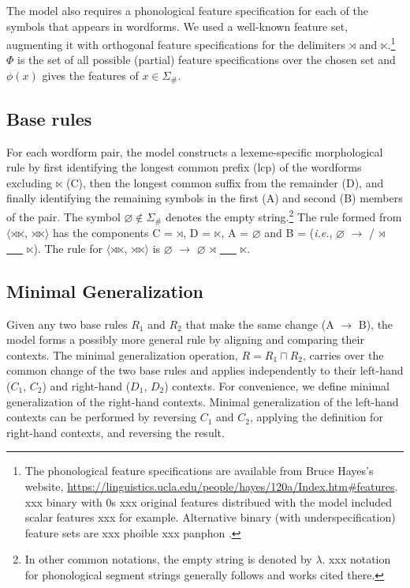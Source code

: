 \documentclass[11pt]{article}
\begin{document}
The model also requires a phonological feature specification for each of the symbols that appears in wordforms. We used a well-known feature set, augmenting it with orthogonal feature specifications for the delimiters $\rtimes$ and $\ltimes$.\footnote{The phonological feature specifications are available from Bruce Hayes's website, \url{https://linguistics.ucla.edu/people/hayes/120a/Index.htm\#features}. xxx binary with 0s xxx original features distribued with the model included scalar features xxx for example. Alternative binary (with underspecification) feature sets are xxx phoible \citep{moran2014} xxx panphon \citep{mortensen-etal-2016-panphon}.} $\Phi$ is the set of all possible (partial) feature specifications over the chosen set and $\phi(x)$ gives the features of $x \in \Sigma_{\#}$.

\subsection{Base rules}

For each wordform pair, the model constructs a lexeme-specific morphological rule by first identifying the longest common prefix (lcp) of the wordforms excluding $\ltimes$ (C), then the longest common suffix from the remainder (D), and finally identifying the remaining symbols in the first (A) and second (B) members of the pair. The symbol $\varnothing \notin \Sigma_{\#}$ denotes the empty string.\footnote{In other common notations, the empty string is denoted by $\lambda$. xxx notation for phonological segment strings generally follows \citep{chandlee2017a} and works cited there.} The rule formed from $\langle$$\rtimes$$\ltimes$, $\rtimes$$\ltimes$$\rangle$ has the components C = $\rtimes$, D = $\ltimes$, A = $\varnothing$ and B =  (\emph{i.e.}, $\varnothing$ $\to$  / $\rtimes$ \underline{\ \ \ } $\ltimes$). The rule for $\langle$$\rtimes$$\ltimes$, $\rtimes$$\ltimes$$\rangle$ is $\varnothing$ $\to$ $\varnothing$ $\rtimes$ \underline{\ \ \ } $\ltimes$.

\subsection{Minimal Generalization}
\label{sec:mingenop}
Given any two base rules $R_1$ and $R_2$ that make the same change (A $\to$ B), the model forms a possibly more general rule by aligning and comparing their contexts. The minimal generalization operation, $R = R_1 \sqcap R_2$, carries over the common change of the two base rules and applies independently to their left-hand ($C_1$, $C_2$) and right-hand ($D_1$, $D_2$) contexts. For convenience, we define minimal generalization of the right-hand contexts. Minimal generalization of the left-hand contexts can be performed by reversing $C_1$ and $C_2$, applying the definition for right-hand contexts, and reversing the result.
\end{document}
